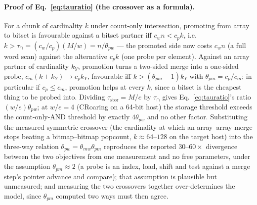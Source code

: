 \paragraph*{Proof of Eq.~\eqref{eq:tauratio} (the crossover as a formula).}
For a chunk of cardinality $k$ under count-only intersection, promoting from array to bitset is
favourable against a bitset partner iff $c_wn<c_pk$, i.e.\ $k>\tau_\cap=(c_w/c_p)(M/w)=n/\theta_{pw}$
--- the promoted side now costs $c_wn$ (a full word scan) against the alternative $c_pk$ (one probe
per element). Against an array partner of cardinality $k_Y$, promotion turns a two-sided merge into a
one-sided probe, $c_m(k+k_Y)\to c_pk_Y$, favourable iff $k>(\theta_{pm}-1)k_Y$ with
$\theta_{pm}=c_p/c_m$; in particular if $c_p\le c_m$, promotion helps at every $k$, since a bitset is
the cheapest thing to be probed into. Dividing $\tau_{\mathrm{stor}}=M/e$ by $\tau_\cap$ gives
Eq.~\eqref{eq:tauratio}'s ratio $(w/e)\theta_{pw}$; at $w/e=4$ (CRoaring on a 64-bit host) the storage
threshold exceeds the count-only-AND threshold by exactly $4\theta_{pw}$ and no other factor.
Substituting the measured symmetric crossover (the cardinality at which an array--array merge stops
beating a bitmap--bitmap popcount, $k\approx64$--$128$ on the target host) into the three-way relation
$\theta_{pw}=\theta_{mw}\theta_{pm}$ reproduces the reported $30$--$60\times$ divergence between the
two objectives from one measurement and no free parameters, under the assumption $\theta_{pm}\approx2$
(a probe is an index, load, shift and test against a merge step's pointer advance and compare); that
assumption is plausible but unmeasured; and measuring the two crossovers together over-determines the
model, since $\theta_{pm}$ computed two ways must then agree.

